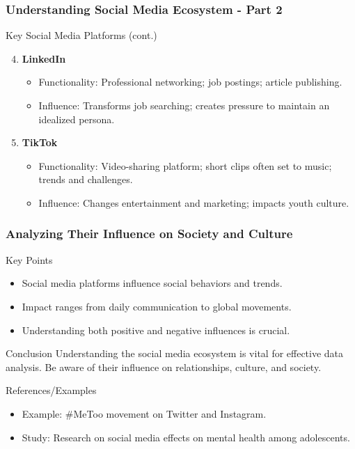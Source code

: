 \documentclass{beamer}
\begin{document}
\begin{frame}[fragile]
    \frametitle{Understanding Social Media Ecosystem - Part 2}
    \begin{block}{Key Social Media Platforms (cont.)}
        \begin{enumerate}
            \setcounter{enumi}{3}
            \item \textbf{LinkedIn}
                \begin{itemize}
                    \item Functionality: Professional networking; job postings; article publishing.
                    \item Influence: Transforms job searching; creates pressure to maintain an idealized persona.
                \end{itemize}
            \item \textbf{TikTok}
                \begin{itemize}
                    \item Functionality: Video-sharing platform; short clips often set to music; trends and challenges.
                    \item Influence: Changes entertainment and marketing; impacts youth culture.
                \end{itemize}
        \end{enumerate}
    \end{block}
\end{frame}

\begin{frame}[fragile]
    \frametitle{Analyzing Their Influence on Society and Culture}
    \begin{block}{Key Points}
        \begin{itemize}
            \item Social media platforms influence social behaviors and trends.
            \item Impact ranges from daily communication to global movements.
            \item Understanding both positive and negative influences is crucial.
        \end{itemize}
    \end{block}
    
    \begin{block}{Conclusion}
        Understanding the social media ecosystem is vital for effective data analysis. Be aware of their influence on relationships, culture, and society.
    \end{block}

    \begin{block}{References/Examples}
        \begin{itemize}
            \item Example: #MeToo movement on Twitter and Instagram.
            \item Study: Research on social media effects on mental health among adolescents.
        \end{itemize}
    \end{block}
\end{frame}
\end{document}

